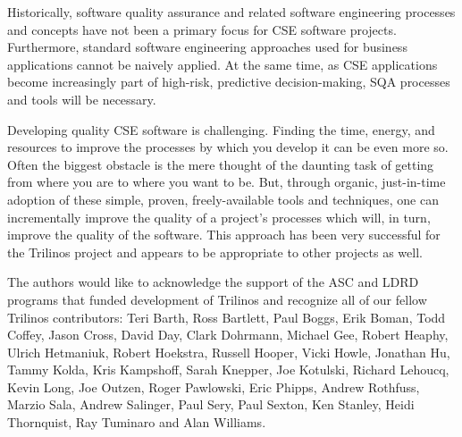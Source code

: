 \documentclass{doublecol}
\begin{document}
Historically, software quality assurance and related software
engineering processes and concepts have not been a primary focus for
CSE software projects.  Furthermore, standard software engineering
approaches used for business applications cannot be naively applied.
At the same time, as CSE applications become increasingly part of
high-risk, predictive decision-making, SQA processes and tools will
be necessary.

Developing quality CSE software is challenging. Finding the time,
energy, and resources to improve the processes by which you develop
it can be even more so. Often the biggest obstacle is the mere
thought of the daunting task of getting from where you are to where
you want to be. But, through organic, just-in-time adoption of these
simple, proven, freely-available tools and techniques, one can
incrementally improve the quality of a project's processes which
will, in turn, improve the quality of the software.  This approach
has been very successful for the Trilinos project and appears to be
appropriate to other projects as well.



The authors would like to acknowledge the support of the ASC and
LDRD programs that funded development of Trilinos and recognize all
of our fellow Trilinos contributors: Teri Barth,
Ross Bartlett, Paul Boggs, Erik Boman, Todd Coffey, Jason Cross, 
David Day, Clark Dohrmann,
Michael Gee, Robert Heaphy, Ulrich Hetmaniuk, Robert Hoekstra,
Russell Hooper, Vicki Howle, Jonathan Hu, Tammy Kolda, Kris
Kampshoff, Sarah Knepper, Joe Kotulski, Richard Lehoucq, Kevin Long,
Joe Outzen, Roger Pawlowski, Eric Phipps, Andrew Rothfuss, Marzio
Sala, Andrew Salinger, Paul Sery, Paul Sexton, Ken Stanley, Heidi
Thornquist, Ray Tuminaro and Alan Williams.



\end{document}
